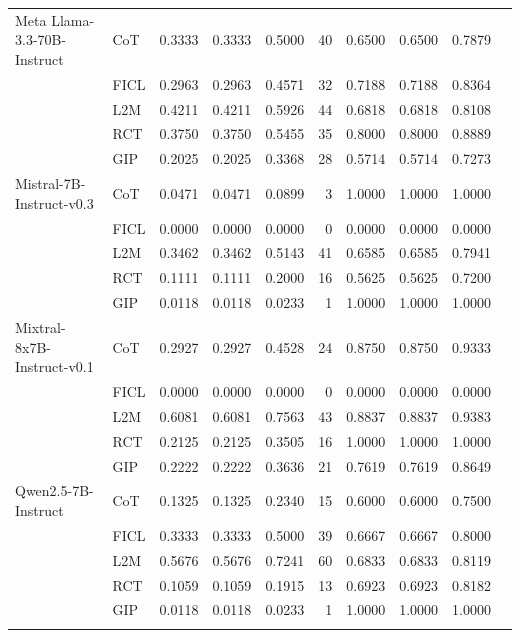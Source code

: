 \documentclass[conference]{IEEEtran}
\begin{document}
\begin{longtable}{p{3.5cm} l r r r r r r r r}
Meta Llama-3.3-70B-Instruct & CoT  & 0.3333 & 0.3333 & 0.5000 & 40 & 0.6500 & 0.6500 & 0.7879 \\
                            & FICL & 0.2963 & 0.2963 & 0.4571 & 32 & 0.7188 & 0.7188 & 0.8364 \\
                            & L2M  & 0.4211 & 0.4211 & 0.5926 & 44 & 0.6818 & 0.6818 & 0.8108 \\
                            & RCT  & 0.3750 & 0.3750 & 0.5455 & 35 & 0.8000 & 0.8000 & 0.8889 \\
                            & GIP  & 0.2025 & 0.2025 & 0.3368 & 28 & 0.5714 & 0.5714 & 0.7273 \\ \addlinespace
Mistral-7B-Instruct-v0.3 & CoT  & 0.0471 & 0.0471 & 0.0899 & 3 & 1.0000 & 1.0000 & 1.0000 \\
                         & FICL & 0.0000 & 0.0000 & 0.0000 & 0 & 0.0000 & 0.0000 & 0.0000 \\
                         & L2M  & 0.3462 & 0.3462 & 0.5143 & 41 & 0.6585 & 0.6585 & 0.7941 \\
                         & RCT  & 0.1111 & 0.1111 & 0.2000 & 16 & 0.5625 & 0.5625 & 0.7200 \\
                         & GIP  & 0.0118 & 0.0118 & 0.0233 & 1 & 1.0000 & 1.0000 & 1.0000 \\ \addlinespace
Mixtral-8x7B-Instruct-v0.1 & CoT  & 0.2927 & 0.2927 & 0.4528 & 24 & 0.8750 & 0.8750 & 0.9333 \\
                           & FICL & 0.0000 & 0.0000 & 0.0000 & 0 & 0.0000 & 0.0000 & 0.0000 \\
                           & L2M  & 0.6081 & 0.6081 & 0.7563 & 43 & 0.8837 & 0.8837 & 0.9383 \\
                           & RCT  & 0.2125 & 0.2125 & 0.3505 & 16 & 1.0000 & 1.0000 & 1.0000 \\
                           & GIP  & 0.2222 & 0.2222 & 0.3636 & 21 & 0.7619 & 0.7619 & 0.8649 \\ \addlinespace
Qwen2.5-7B-Instruct & CoT  & 0.1325 & 0.1325 & 0.2340 & 15 & 0.6000 & 0.6000 & 0.7500 \\
                    & FICL & 0.3333 & 0.3333 & 0.5000 & 39 & 0.6667 & 0.6667 & 0.8000 \\
                    & L2M  & 0.5676 & 0.5676 & 0.7241 & 60 & 0.6833 & 0.6833 & 0.8119 \\
                    & RCT  & 0.1059 & 0.1059 & 0.1915 & 13 & 0.6923 & 0.6923 & 0.8182 \\
                    & GIP  & 0.0118 & 0.0118 & 0.0233 & 1 & 1.0000 & 1.0000 & 1.0000 \\ \addlinespace

\end{longtable}
\end{document}

